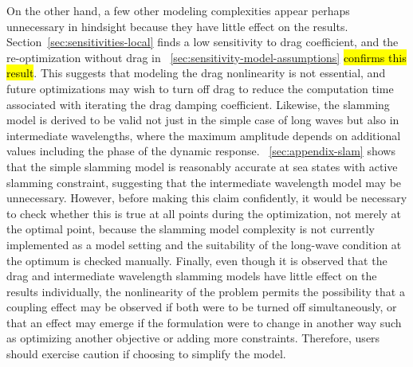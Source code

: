 On the other hand, a few other modeling complexities appear perhaps unnecessary in hindsight because they have little effect on the results. Section~\ref{sec:sensitivities-local} finds a low sensitivity to drag coefficient, and the re-optimization without drag in \sectionautorefname~\ref{sec:sensitivity-model-assumptions} \hl{confirms this result}. This suggests that modeling the drag nonlinearity is not essential, and future optimizations may wish to turn off drag to reduce the computation time associated with iterating the drag damping coefficient. Likewise, the slamming model is derived to be valid not just in the simple case of long waves but also in intermediate wavelengths, where the maximum amplitude depends on additional values including the phase of the dynamic response. \appendixautorefname~\ref{sec:appendix-slam} shows that the simple slamming model is reasonably accurate at sea states with active slamming constraint, suggesting that the intermediate wavelength model may be unnecessary. However, before making this claim confidently, it would be necessary to check whether this is true at all points during the optimization, not merely at the optimal point, because the slamming model complexity is not currently implemented as a model setting and the suitability of the long-wave condition at the optimum is checked manually. %
Finally, even though it is observed that the drag and intermediate wavelength slamming models have little effect on the results individually, the nonlinearity of the problem permits the possibility that a coupling effect may be observed if both were to be turned off simultaneously, or that an effect may emerge if the formulation were to change in another way such as optimizing another objective or adding more constraints. Therefore, users should exercise caution if choosing to simplify the model.

